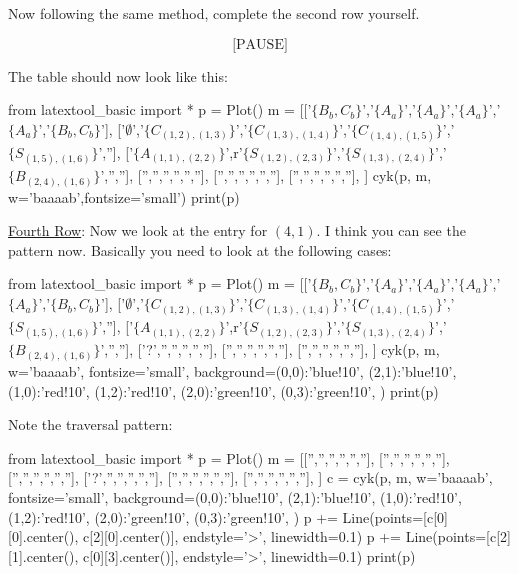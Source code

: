 Now following the same method, complete the second row yourself.

\[
  \text{[PAUSE]}
\]

\newpage
The table should now look like this:
\begin{python}
from latextool_basic import *
p = Plot()
m = [['$\{B_b,C_b\}$','$\{A_a\}$','$\{A_a\}$','$\{A_a\}$','$\{A_a\}$','$\{B_b,C_b\}$'],
     ['$\emptyset$','$\{C_{(1,2),(1,3)}\}$','$\{C_{(1,3),(1,4)}\}$','$\{C_{(1,4),(1,5)}\}$','$\{S_{(1,5),(1,6)}\}$',''],
     ['$\{A_{(1,1),(2,2)}\}$',r'$\{S_{(1,2),(2,3)}\}$','$\{S_{(1,3),(2,4)}\}$','$\{B_{(2,4),(1,6)}\}$','',''],
     ['','','','','',''],
     ['','','','','',''],
     ['','','','','',''],
     ]
cyk(p, m, w='baaaab',fontsize='small')
print(p)
\end{python}

\underline{Fourth Row}:
Now we look at the entry for $(4,1)$.
I think you can see the pattern now.
Basically you need to look at the following cases:
\begin{python}
from latextool_basic import *
p = Plot()
m = [['$\{B_b,C_b\}$','$\{A_a\}$','$\{A_a\}$','$\{A_a\}$','$\{A_a\}$','$\{B_b,C_b\}$'],
     ['$\emptyset$','$\{C_{(1,2),(1,3)}\}$','$\{C_{(1,3),(1,4)}\}$','$\{C_{(1,4),(1,5)}\}$','$\{S_{(1,5),(1,6)}\}$',''],
     ['$\{A_{(1,1),(2,2)}\}$',r'$\{S_{(1,2),(2,3)}\}$','$\{S_{(1,3),(2,4)}\}$','$\{B_{(2,4),(1,6)}\}$','',''],
     ['?','','','','',''],
     ['','','','','',''],
     ['','','','','',''],
     ]
cyk(p, m, w='baaaab', fontsize='small',
    background={(0,0):'blue!10',  (2,1):'blue!10',
                (1,0):'red!10',   (1,2):'red!10',
                (2,0):'green!10', (0,3):'green!10',
    })
print(p)
\end{python}
Note the traversal pattern:
\begin{python}
from latextool_basic import *
p = Plot()
m = [['','','','','',''],
     ['','','','','',''],
     ['','','','','',''],
     ['?','','','','',''],
     ['','','','','',''],
     ['','','','','',''],
     ]
c = cyk(p, m, w='baaaab', fontsize='small',
    background={(0,0):'blue!10',  (2,1):'blue!10',
                (1,0):'red!10',   (1,2):'red!10',
                (2,0):'green!10', (0,3):'green!10',
    })
p += Line(points=[c[0][0].center(), c[2][0].center()], endstyle='>', linewidth=0.1)
p += Line(points=[c[2][1].center(), c[0][3].center()], endstyle='>', linewidth=0.1)
print(p)
\end{python}

